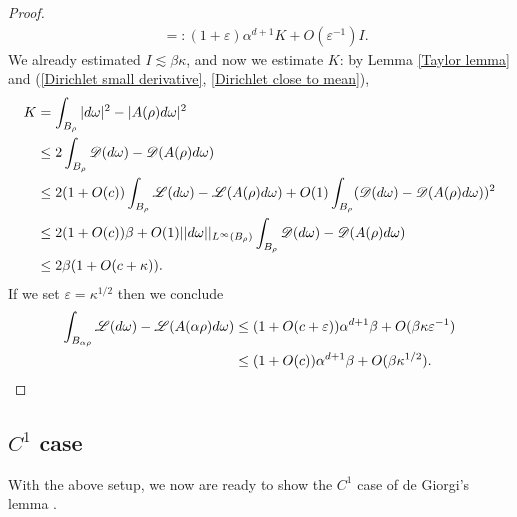 \begin{proof}
\begin{align*}
&=: (1 + \varepsilon)\alpha^{d + 1}K + O(\varepsilon^{-1})I.
\end{align*}
We already estimated $I \lesssim \beta \kappa$, and now we estimate $K$: by Lemma \ref{Taylor lemma} and (\ref{Dirichlet small derivative}, \ref{Dirichlet close to mean}),
\begin{align*}
K &= \int_{B_\rho} |d\omega|^2 - |A(\rho)d\omega|^2\\
&\leq 2\int_{B_\rho} \mathscr D(d\omega) - \mathscr D(A(\rho)d\omega)\\
&\leq 2(1 + O(c))\int_{B_\rho} \mathscr L(d\omega) - \mathscr L(A(\rho)d\omega) + O(1) \int_{B_\rho} (\mathscr D(d\omega) - \mathscr D(A(\rho)d\omega))^2\\
&\leq 2(1 + O(c))\beta + O(1) ||d\omega||_{L^\infty(B_\rho)} \int_{B_\rho} \mathscr D(d\omega) - \mathscr D(A(\rho)d\omega) \\
&\leq 2\beta(1 + O(c + \kappa)).
\end{align*}
If we set $\varepsilon = \kappa^{1/2}$ then we conclude
\begin{align*}
\int_{B_{\alpha\rho}} \mathscr L(d\omega) - \mathscr L(A(\alpha\rho)d\omega)
&\leq (1 + O(c + \varepsilon)) \alpha^{d + 1}\beta + O(\beta \kappa \varepsilon^{-1})\\
&\leq (1 + O(c))\alpha^{d + 1} \beta + O(\beta \kappa^{1/2}). \qedhere
\end{align*}
\end{proof}

\subsection{\texorpdfstring{$C^1$}{C1} case}
With the above setup, we now are ready to show the $C^1$ case of de Giorgi's lemma \cite[Teorema 4.4]{Miranda66}.

